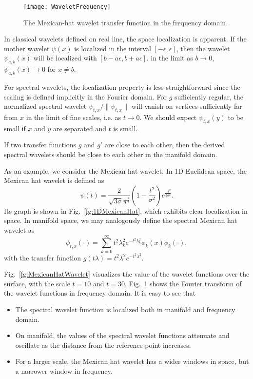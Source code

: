\begin{figure}
  \centering
  \texttt{[image: WaveletFrequency]}\\
  \caption[Transfer function of the Mexican-hat wavelet.]
  {The Mexican-hat wavelet transfer function in the frequency domain. }\label{fg:WaveletFrequency}
\end{figure}

In classical wavelets defined on real line, the space localization is apparent. If the mother wavelet $\psi(x)$ is localized in the interval $[-\epsilon,\epsilon]$, then the wavelet $\psi_{a,b}(x)$ will be localized with $[b-a\epsilon,b+a\epsilon]$. in the limit as $b\to 0$, $\psi_{a,b}(x)\to 0$ for $x\neq b$.

For spectral wavelets, the localization property is less straightforward since the scaling is defined implicitly in the Fourier domain. For $g$ sufficiently regular, the normalized spectral wavelet $\psi_{t,x}/\|\psi_{t,x}\|$ will vanish on vertices sufficiently far from $x$ in the limit of fine scales, i.e. as $t\to 0$. We should expect $\psi_{t,x}(y)$ to be small if $x$ and $y$ are separated and $t$ is small.

If two transfer functions $g$ and $g'$ are close to each other, then the derived spectral wavelets should be close to each other in the manifold domain.

As an example, we consider the Mexican hat wavelet. In 1D Euclidean space, the Mexican hat wavelet is defined as
\begin{equation}
\psi(t)=\frac{2}{\sqrt{3\sigma}\pi^{\frac{1}{4}}}(1-\frac{t^2}{\sigma^2})e^{\frac{-t^2}{2\sigma^2}}.
\end{equation}
Its graph is shown in Fig.~\ref{fg:1DMexicanHat}, which exhibits clear localization in space. In manifold space, we may analogously define the spectral Mexican hat wavelet as
\begin{equation}
\psi_{t,x}(\cdot)=\sum_{k=0}^\infty t^2\lambda_k^2 e^{-t^2\lambda_k^2}\phi_k(x)\phi_k(\cdot),
\end{equation}
with the transfer function $g(t\lambda)=t^2\lambda^2 e^{-t^2\lambda^2}$.

Fig.~\ref{fg:MexicanHatWavelet} visualizes the value of the wavelet functions over the surface, with the scale $t=10$ and $t=30$. Fig.~\ref{fg:WaveletFrequency} shows the Fourier transform of the wavelet functions in frequency domain. It is easy to see that

\begin{itemize}
\item The spectral wavelet function is localized both in manifold and frequency domain.
\item On manifold, the values of the spectral wavelet functions attenuate and oscillate as the distance from the reference point increases.
\item For a larger scale, the Mexican hat wavelet has a wider windows in space, but a narrower window in frequency.
\end{itemize}

